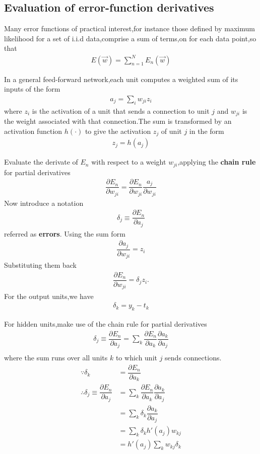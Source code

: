 \subsection{Evaluation of error-function derivatives}
Many error functions of practical interest,for instance those defined by maximum likelihood for a set of i.i.d data,comprise a sum of terms,on for each data point,so that
\begin{align}
E(\vec{w})=\sum_{n=1}^{N}E_n(\vec{w})
\end{align}

In a general feed-forward network,each unit computes a weighted sum of its inputs of the form
\begin{align}
a_j=\sum_i w_{ji} z_i
\end{align}
where $z_i$ is the activation of a unit that sends a connection to unit $j$ and $w_{ji}$ is the weight associated with that connection.The sum is transformed by an activation function $h(\cdot)$ to give the activation $z_j$ of unit $j$ in the form
\begin{align}
z_j=h(a_j)
\end{align}

Evaluate the derivate of $E_n$ with respect to a weight $w_{ji}$,applying the \textbf{chain rule} for partial derivatives
\begin{align}
\dfrac{\partial E_n}{\partial w_{ji}}=\dfrac{\partial E_n}{\partial w_{ji}}\dfrac{a_j}{\partial w_{ji}}
\end{align}
Now introduce a notation
\begin{align}
\delta_j \equiv \dfrac{\partial E_n}{\partial a_j}
\end{align}
referred as \textbf{errors}.
Using the sum form
\begin{align}
\dfrac{\partial a_j}{\partial w_{ji}} = z_i
\end{align}
Substituting them back
\begin{align}
\dfrac{\partial E_n}{\partial w_{ji}}=\delta_j z_i.
\end{align}
For the output units,we have
\begin{align}
\delta_k=y_k-t_k
\end{align}

For hidden units,make use of the chain rule for partial derivatives
\begin{align}
\delta_j\equiv \dfrac{\partial E_n}{\partial a_j}=
\sum_k \dfrac{\partial E_n}{\partial a_k}\dfrac{\partial a_k}{\partial a_j} \\
\end{align}
where the sum runs over all units $k$ to which unit $j$ sends connections.
\begin{align}
\because \delta_k &= \dfrac{\partial E_n}{\partial a_k}\\
\therefore
\delta_j\equiv \dfrac{\partial E_n}{\partial a_j} &=
\sum_k \dfrac{\partial E_n}{\partial a_k}\dfrac{\partial a_k}{\partial a_j} \\
&=\sum_k \delta_k\dfrac{\partial a_k}{\partial a_j} \\
&=\sum_k \delta_k h'(a_j)w_{kj} \\
&= h'(a_j)\sum_k w_{kj}\delta_k
\end{align}

